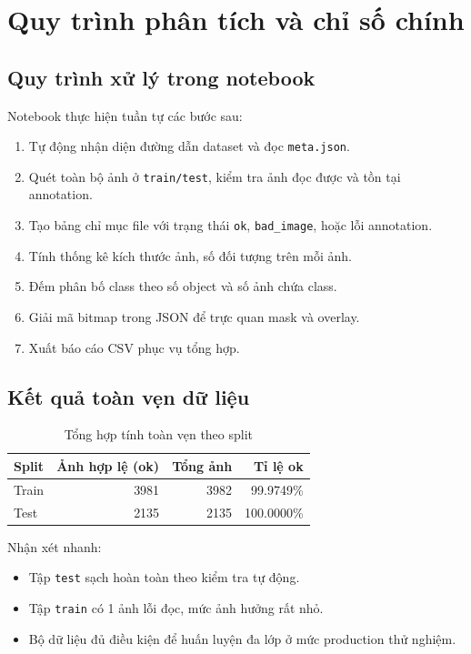 \section{Quy trình phân tích và chỉ số chính}

\subsection{Quy trình xử lý trong notebook}
Notebook thực hiện tuần tự các bước sau:
\begin{enumerate}[leftmargin=1.5em]
    \item Tự động nhận diện đường dẫn dataset và đọc \texttt{meta.json}.
    \item Quét toàn bộ ảnh ở \texttt{train/test}, kiểm tra ảnh đọc được và tồn tại annotation.
    \item Tạo bảng chỉ mục file với trạng thái \texttt{ok}, \texttt{bad\_image}, hoặc lỗi annotation.
    \item Tính thống kê kích thước ảnh, số đối tượng trên mỗi ảnh.
    \item Đếm phân bố class theo số object và số ảnh chứa class.
    \item Giải mã bitmap trong JSON để trực quan mask và overlay.
    \item Xuất báo cáo CSV phục vụ tổng hợp.
\end{enumerate}

\subsection{Kết quả toàn vẹn dữ liệu}
\begin{table}[H]
    \centering
    \caption{Tổng hợp tính toàn vẹn theo split}
    \begin{tabular}{lrrr}
        \toprule
        Split & Ảnh hợp lệ (ok) & Tổng ảnh & Tỉ lệ ok \\
        \midrule
        Train & 3981 & 3982 & 99.9749\% \\
        Test  & 2135 & 2135 & 100.0000\% \\
        \bottomrule
    \end{tabular}
\end{table}

Nhận xét nhanh:
\begin{itemize}[leftmargin=1.5em]
    \item Tập \texttt{test} sạch hoàn toàn theo kiểm tra tự động.
    \item Tập \texttt{train} có 1 ảnh lỗi đọc, mức ảnh hưởng rất nhỏ.
    \item Bộ dữ liệu đủ điều kiện để huấn luyện đa lớp ở mức production thử nghiệm.
\end{itemize}

